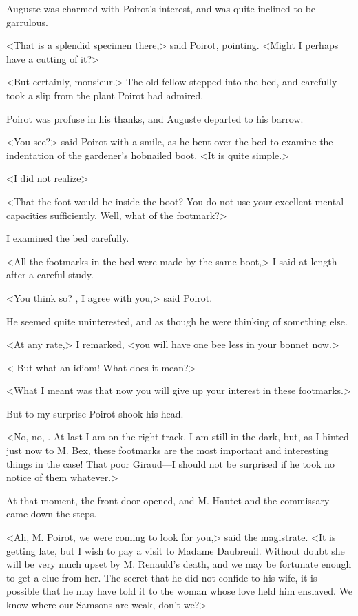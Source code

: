  Auguste was charmed with Poirot's interest, and was quite inclined to be garrulous. 

 <That is a splendid specimen there,> said Poirot, pointing. <Might I perhaps have a cutting of it?> 

 <But certainly, monsieur.> The old fellow stepped into the bed, and carefully took a slip from the plant Poirot had admired. 

 Poirot was profuse in his thanks, and Auguste departed to his barrow. 

 <You see?> said Poirot with a smile, as he bent over the bed to examine the indentation of the gardener's hobnailed boot. <It is quite simple.> 

 <I did not realize\longdash> 

 <That the foot would be inside the boot? You do not use your excellent mental capacities sufficiently. Well, what of the footmark?> 

 I examined the bed carefully. 

 <All the footmarks in the bed were made by the same boot,> I said at length after a careful study. 

 <You think so? , I agree with you,> said Poirot. 

 He seemed quite uninterested, and as though he were thinking of something else. 

 <At any rate,> I remarked, <you will have one bee less in your bonnet now.> 

 < But what an idiom! What does it mean?> 

 <What I meant was that now you will give up your interest in these footmarks.> 

 But to my surprise Poirot shook his head. 

 <No, no, . At last I am on the right track. I am still in the dark, but, as I hinted just now to M. Bex, these footmarks are the most important and interesting things in the case! That poor Giraud—I should not be surprised if he took no notice of them whatever.> 

 At that moment, the front door opened, and M. Hautet and the commissary came down the steps. 

 <Ah, M. Poirot, we were coming to look for you,> said the magistrate. <It is getting late, but I wish to pay a visit to Madame Daubreuil. Without doubt she will be very much upset by M. Renauld's death, and we may be fortunate enough to get a clue from her. The secret that he did not confide to his wife, it is possible that he may have told it to the woman whose love held him enslaved. We know where our Samsons are weak, don't we?> 

